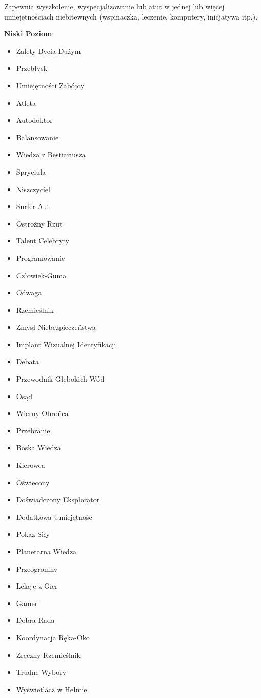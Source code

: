 Zapewnia wyszkolenie, wyspecjalizowanie lub atut w jednej lub więcej umiejętnościach niebitewnych (wspinaczka, leczenie, komputery, inicjatywa itp.).

\textbf{Niski Poziom}:

\begin{itemize}
\item Zalety Bycia Dużym
\item Przebłysk
\item Umiejętności Zabójcy
\item Atleta
\item Autodoktor
\item Balansowanie
\item Wiedza z Bestiariusza
\item Spryciula
\item Niszczyciel
\item Surfer Aut
\item Ostrożny Rzut
\item Talent Celebryty
\item Programowanie
\item Człowiek-Guma
\item Odwaga
\item Rzemieślnik
\item Zmysł Niebezpieczeństwa 
\item Implant Wizualnej Identyfikacji
\item Debata
\item Przewodnik Głębokich Wód
\item Osąd
\item Wierny Obrońca
\item Przebranie
\item Boska Wiedza 
\item Kierowca
\item Oświecony
\item Doświadczony Eksplorator 
\item Dodatkowa Umiejętność 
\item Pokaz Siły
\item Planetarna Wiedza
\item Przeogromny
\item Lekcje z Gier
\item Gamer
\item Dobra Rada
\item Koordynacja Ręka-Oko
\item Zręczny Rzemieślnik
\item Trudne Wybory
\item Wyświetlacz w Hełmie

\end{itemize}
